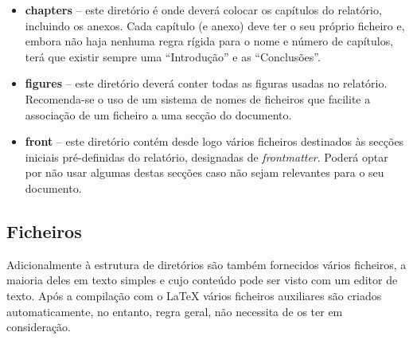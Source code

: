 \begin{itemize}
     \item \textbf{chapters} -- este diretório é onde deverá colocar os capítulos do relatório, incluindo os anexos. Cada capítulo (e anexo) deve ter o seu próprio ficheiro  e, embora não haja nenhuma regra rígida para o nome e número de capítulos, terá que existir sempre uma ``Introdução'' e as ``Conclusões''.

     \item \textbf{figures} -- este diretório deverá conter todas as figuras usadas no relatório. Recomenda-se o uso de um sistema de nomes de ficheiros que facilite a associação de um ficheiro a uma secção do documento.

     \item \textbf{front} -- este diretório contém desde logo vários ficheiros destinados às secções iniciais pré-definidas do relatório, designadas de \textit{frontmatter}. Poderá optar por não usar algumas destas secções caso não sejam relevantes para o seu documento.
\end{itemize}

\subsection{Ficheiros}

Adicionalmente à estrutura de diretórios são também fornecidos vários ficheiros, a maioria deles em texto simples e cujo conteúdo pode ser visto com um editor de texto. Após a compilação com o \LaTeX{} vários ficheiros auxiliares são criados automaticamente, no entanto, regra geral, não necessita de os ter em consideração.

